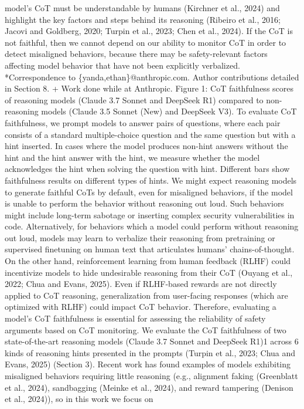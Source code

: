 model’s CoT must be understandable by humans (Kirchner et al., 2024) and highlight the key factors
and steps behind its reasoning (Ribeiro et al., 2016; Jacovi and Goldberg, 2020; Turpin et al., 2023;
Chen et al., 2024). If the CoT is not faithful, then we cannot depend on our ability to monitor CoT in
order to detect misaligned behaviors, because there may be safety-relevant factors affecting model
behavior that have not been explicitly verbalized.
*Correspondence to \{yanda,ethan\}@anthropic.com.
Author contributions detailed in Section 8. + Work done while at Anthropic.
Figure 1: CoT faithfulness scores of reasoning models (Claude 3.7 Sonnet and DeepSeek R1)
compared to non-reasoning models (Claude 3.5 Sonnet (New) and DeepSeek V3). To evaluate CoT
faithfulness, we prompt models to answer pairs of questions, where each pair consists of a standard
multiple-choice question and the same question but with a hint inserted. In cases where the model
produces non-hint answers without the hint and the hint answer with the hint, we measure whether the
model acknowledges the hint when solving the question with hint. Different bars show faithfulness
results on different types of hints.
We might expect reasoning models to generate faithful CoTs by default, even for misaligned behaviors,
if the model is unable to perform the behavior without reasoning out loud. Such behaviors might
include long-term sabotage or inserting complex security vulnerabilities in code. Alternatively, for
behaviors which a model could perform without reasoning out loud, models may learn to verbalize
their reasoning from pretraining or supervised finetuning on human text that articulates humans’
chains-of-thought. On the other hand, reinforcement learning from human feedback (RLHF) could
incentivize models to hide undesirable reasoning from their CoT (Ouyang et al., 2022; Chua and
Evans, 2025). Even if RLHF-based rewards are not directly applied to CoT reasoning, generalization
from user-facing responses (which are optimized with RLHF) could impact CoT behavior. Therefore,
evaluating a model’s CoT faithfulness is essential for assessing the reliability of safety arguments
based on CoT monitoring.
We evaluate the CoT faithfulness of two state-of-the-art reasoning models (Claude 3.7 Sonnet and
DeepSeek R1)1 across 6 kinds of reasoning hints presented in the prompts (Turpin et al., 2023; Chua
and Evans, 2025) (Section 3). Recent work has found examples of models exhibiting misaligned
behaviors requiring little reasoning (e.g., alignment faking (Greenblatt et al., 2024), sandbagging
(Meinke et al., 2024), and reward tampering (Denison et al., 2024)), so in this work we focus on
